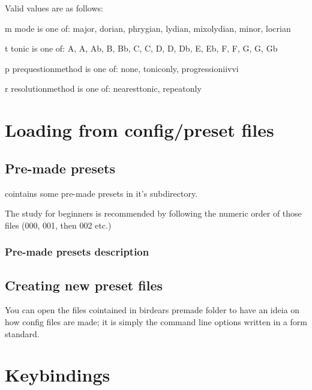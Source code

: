 \documentclass[letterpaper,10pt,english]{sphinxmanual}
\begin{document}
\begin{sphinxVerbatim}[commandchars=\\\{\}]
  Valid values are as follows:

  \PYGZhy{}m \PYGZlt{}mode\PYGZgt{} is one of: major, dorian, phrygian, lydian, mixolydian, minor,
  locrian

  \PYGZhy{}t \PYGZlt{}tonic\PYGZgt{} is one of: A, A\PYGZsh{}, Ab, B, Bb, C, C\PYGZsh{}, D, D\PYGZsh{}, Db, E, Eb, F, F\PYGZsh{}, G,
  G\PYGZsh{}, Gb

  \PYGZhy{}p \PYGZlt{}prequestion\PYGZus{}method\PYGZgt{} is one of: none, tonic\PYGZus{}only, progression\PYGZus{}i\PYGZus{}iv\PYGZus{}v\PYGZus{}i

  \PYGZhy{}r \PYGZlt{}resolution\PYGZus{}method\PYGZgt{} is one of: nearest\PYGZus{}tonic, repeat\PYGZus{}only
\end{sphinxVerbatim}


\section{Loading from config/preset files}
\label{\detokenize{index:loading-from-config-preset-files}}

\subsection{Pre-made presets}
\label{\detokenize{index:pre-made-presets}}
 cointains some pre-made presets in it’s 
subdirectory.

The study for beginners is recommended by following the numeric order of
those files (000, 001, then 002 etc.)


\subsubsection{Pre-made presets description}
\label{\detokenize{index:pre-made-presets-description}}


\subsection{Creating new preset files}
\label{\detokenize{index:creating-new-preset-files}}
You can open the files cointained in birdears premade 
folder to have an ideia on how config files are made; it is simply the
command line options written in a form  standard.


\section{Keybindings}
\label{\detokenize{index:keybindings}}
\end{document}
